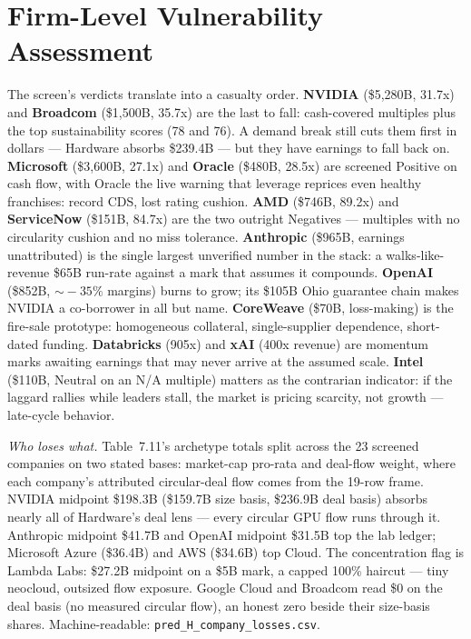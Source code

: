 \documentclass[11pt,a4paper]{article}
\begin{document}
\section{Firm-Level Vulnerability Assessment}\label{sec:firms}
The screen's verdicts translate into a casualty order. \textbf{NVIDIA}
(\$5,280B, 31.7x) and \textbf{Broadcom} (\$1,500B, 35.7x) are the last to
fall: cash-covered multiples plus the top sustainability scores (78 and 76).
A demand break still cuts them first in dollars --- Hardware absorbs
\$239.4B --- but they have earnings to fall back on. \textbf{Microsoft}
(\$3,600B, 27.1x) and \textbf{Oracle} (\$480B, 28.5x) are screened Positive
on cash flow, with Oracle the live warning that leverage reprices even
healthy franchises: record CDS, lost rating cushion. \textbf{AMD} (\$746B,
89.2x) and \textbf{ServiceNow} (\$151B, 84.7x) are the two outright
Negatives --- multiples with no circularity cushion and no miss tolerance.
\textbf{Anthropic} (\$965B, earnings unattributed) is the single largest
unverified number in the stack: a walks-like-revenue \$65B run-rate against
a mark that assumes it compounds. \textbf{OpenAI} (\$852B, $\sim\!-35\%$
margins) burns to grow; its \$105B Ohio guarantee chain makes NVIDIA a
co-borrower in all but name. \textbf{CoreWeave} (\$70B, loss-making) is
the fire-sale prototype: homogeneous collateral, single-supplier dependence,
short-dated funding. \textbf{Databricks} (905x) and \textbf{xAI} (400x
revenue) are momentum marks awaiting earnings that may never arrive at the
assumed scale. \textbf{Intel} (\$110B, Neutral on an N/A multiple) matters as the
contrarian indicator: if the laggard rallies while leaders stall, the market
is pricing scarcity, not growth --- late-cycle behavior.

\emph{Who loses what.} Table~7.11's archetype totals split across the
23 screened companies on two stated bases: market-cap pro-rata and
deal-flow weight, where each company's attributed circular-deal flow comes
from the 19-row frame. NVIDIA midpoint \$198.3B (\$159.7B size basis,
\$236.9B deal basis) absorbs nearly all of Hardware's deal lens --- every
circular GPU flow runs through it. Anthropic midpoint \$41.7B and
OpenAI midpoint \$31.5B top the lab ledger; Microsoft Azure (\$36.4B) and AWS
(\$34.6B) top Cloud. The concentration flag is Lambda Labs: \$27.2B
midpoint on a \$5B mark, a capped 100\% haircut --- tiny neocloud, outsized
flow exposure. Google Cloud and Broadcom read \$0 on the deal basis (no
measured circular flow), an honest zero beside their size-basis shares.
Machine-readable: \texttt{pred\_H\_company\_losses.csv}.
\end{document}
